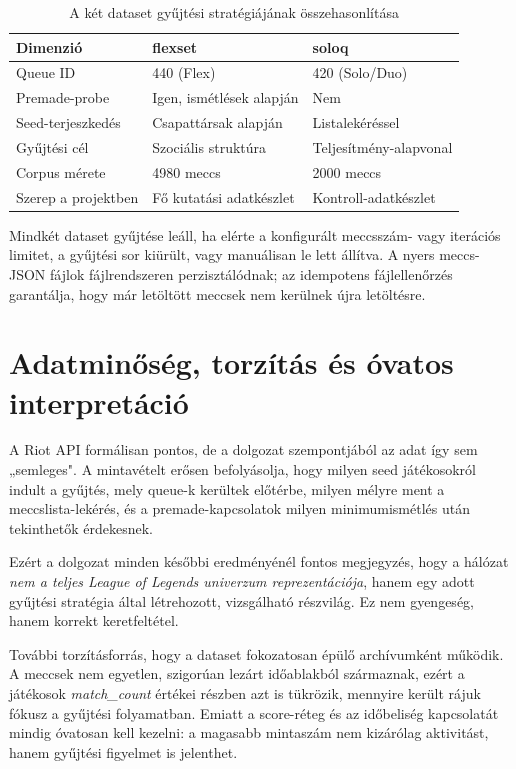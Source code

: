 \begin{table}[H]
\centering
\caption{A két dataset gyűjtési stratégiájának összehasonlítása}
\begin{tabularx}{\textwidth}{>{\raggedright\arraybackslash}p{4.2cm}|X|X}
\toprule
\textbf{Dimenzió} & \textbf{flexset} & \textbf{soloq} \\
\midrule
Queue ID & 440 (Flex) & 420 (Solo/Duo) \\
Premade-probe & Igen, ismétlések alapján & Nem \\
Seed-terjeszkedés & Csapattársak alapján & Listalekéréssel \\
Gyűjtési cél & Szociális struktúra & Teljesítmény-alapvonal \\
Corpus mérete & 4980 meccs & 2000 meccs \\
Szerep a projektben & Fő kutatási adatkészlet & Kontroll-adatkészlet \\
\bottomrule
\end{tabularx}
\end{table}

Mindkét dataset gyűjtése leáll, ha elérte a konfigurált meccsszám- vagy iterációs limitet, a gyűjtési sor kiürült, vagy manuálisan le lett állítva. A nyers meccs-JSON fájlok fájlrendszeren perzisztálódnak; az idempotens fájlellenőrzés garantálja, hogy már letöltött meccsek nem kerülnek újra letöltésre.

\section{Adatminőség, torzítás és óvatos interpretáció}

A Riot API formálisan pontos, de a dolgozat szempontjából az adat így sem „semleges". A mintavételt erősen befolyásolja, hogy milyen seed játékosokról indult a gyűjtés, mely queue-k kerültek előtérbe, milyen mélyre ment a meccslista-lekérés, és a premade-kapcsolatok milyen minimumismétlés után tekinthetők érdekesnek.

Ezért a dolgozat minden későbbi eredményénél fontos megjegyzés, hogy a hálózat \emph{nem a teljes League of Legends univerzum reprezentációja}, hanem egy adott gyűjtési stratégia által létrehozott, vizsgálható részvilág. Ez nem gyengeség, hanem korrekt keretfeltétel.

További torzításforrás, hogy a dataset fokozatosan épülő archívumként működik. A meccsek nem egyetlen, szigorúan lezárt időablakból származnak, ezért a játékosok \textit{match\_count} értékei részben azt is tükrözik, mennyire került rájuk fókusz a gyűjtési folyamatban. Emiatt a score-réteg és az időbeliség kapcsolatát mindig óvatosan kell kezelni: a magasabb mintaszám nem kizárólag aktivitást, hanem gyűjtési figyelmet is jelenthet.
